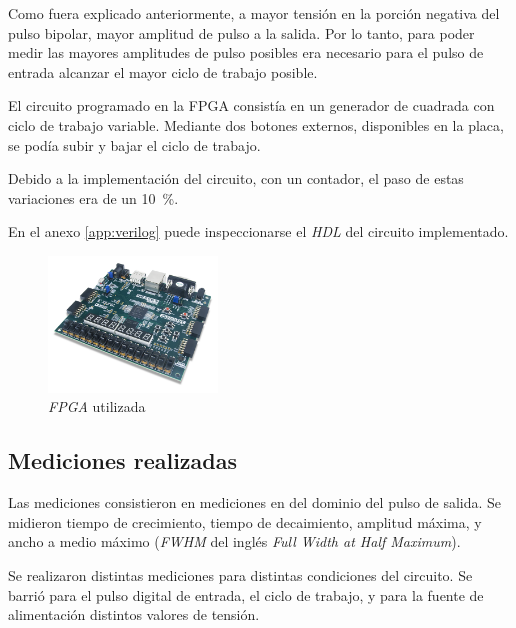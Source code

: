 Como fuera explicado anteriormente, a mayor tensión en la porción negativa del
pulso bipolar, mayor amplitud de pulso a la salida. Por lo tanto, para poder
medir las mayores amplitudes de pulso posibles era necesario para el pulso de
entrada alcanzar el mayor ciclo de trabajo posible.

El circuito programado en la FPGA consistía en un generador de cuadrada con
ciclo de trabajo variable. Mediante dos botones externos, disponibles en la
placa, se podía subir y bajar el ciclo de trabajo.

Debido a la implementación del circuito, con un contador, el paso de estas
variaciones era de un \qty{10}{\percent}.

En el anexo \ref{app:verilog} puede inspeccionarse el \textit{HDL} del circuito implementado.

\begin{figure}
  \centering
    \includegraphics[width=0.4\textwidth]{images/mediciones_fpga.png}
    \caption{\textit{FPGA} utilizada}
    \label{fig:mediciones_fpga}
\end{figure}

\subsection{Mediciones realizadas}

Las mediciones consistieron en mediciones en del dominio del pulso de salida. Se
midieron tiempo de crecimiento, tiempo de decaimiento, amplitud máxima, y ancho
a medio máximo (\textit{FWHM} del inglés \textit{Full Width at Half Maximum}).

Se realizaron distintas mediciones para distintas condiciones del circuito. Se
barrió para el pulso digital de entrada, el ciclo de trabajo, y para la fuente
de alimentación distintos valores de tensión.

